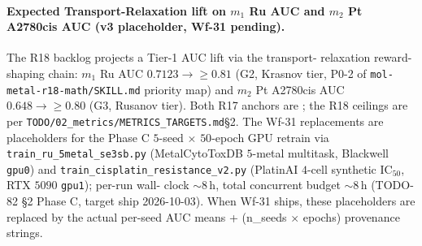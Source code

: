 \paragraph{Expected Transport-Relaxation lift on $m_1$ Ru AUC and
$m_2$ Pt A2780cis AUC (v3 placeholder, Wf-31 pending).}
The R18 backlog projects a Tier-1 AUC lift via the transport-
relaxation reward-shaping chain: $m_1$ Ru AUC
$0.7123 \to \geq 0.81$ (G2, Krasnov tier, \textsc{P0-2} of
\texttt{mol-metal-r18-math/SKILL.md} priority map) and
$m_2$ Pt A2780cis AUC $0.648 \to \geq 0.80$ (G3, Rusanov
tier).  Both R17 anchors are \MEASURED{}; the R18 ceilings are
\PROJECTED{} per \texttt{TODO/02\_metrics/METRICS\_TARGETS.md}\S2.
The Wf-31 replacements are  placeholders for
the Phase C $5$-seed $\times$ $50$-epoch GPU retrain via
\texttt{train\_ru\_5metal\_se3sb.py} (MetalCytoToxDB $5$-metal
multitask, Blackwell \texttt{gpu0}) and
\texttt{train\_cisplatin\_resistance\_v2.py} (PlatinAI $4$-cell
synthetic IC$_{50}$, RTX $5090$ \texttt{gpu1}); per-run wall-
clock $\sim 8$\,h, total concurrent budget $\sim 8$\,h
(TODO-82 \S2 Phase C, target ship 2026-10-03).  When Wf-31
ships, these placeholders are replaced by the actual per-seed
AUC means + (n\_seeds $\times$ epochs) provenance strings.